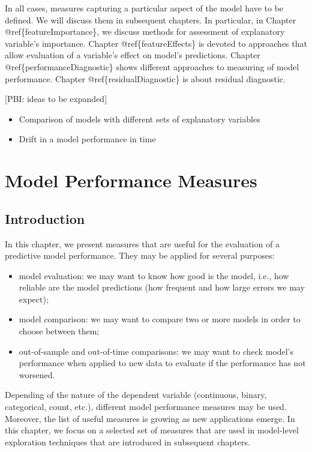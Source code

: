 \documentclass[12pt,]{krantz}
\providecommand{\tightlist}{%
  \setlength{\itemsep}{0pt}\setlength{\parskip}{0pt}}
\begin{document}
In all cases, measures capturing a particular aspect of the model have to be defined. We will discuss them in subsequent chapters. In particular, in Chapter @ref\{featureImportance\}, we discuss methods for assessment of explanatory variable's importance. Chapter @ref\{featureEffects\} is devoted to approaches that allow evaluation of a variable's effect on model's predictions.
Chapter @ref\{performanceDiagnostic\} shows different approaches to measuring of model performance. Chapter @ref\{residualDiagnostic\} is about residual diagnostic.

{[}PBI: ideas to be expanded{]}

\begin{itemize}
\tightlist
\item
  Comparison of models with different sets of explanatory variables
\item
  Drift in a model performance in time
\end{itemize}

\hypertarget{modelPerformance}{%
\section{Model Performance Measures}\label{modelPerformance}}

\hypertarget{modelPerformanceIntro}{%
\subsection{Introduction}\label{modelPerformanceIntro}}

In this chapter, we present measures that are useful for the evaluation of a predictive model performance. They may be applied for several purposes:

\begin{itemize}
\tightlist
\item
  model evaluation: we may want to know how good is the model, i.e., how reliable are the model predictions (how frequent and how large errors we may expect);
\item
  model comparison: we may want to compare two or more models in order to choose between them;
\item
  out-of-sample and out-of-time comparisons: we may want to check model's performance when applied to new data to evaluate if the performance has not worsened.
\end{itemize}

Depending of the nature of the dependent variable (continuous, binary, categorical, count, etc.), different model performance measures may be used. Moreover, the list of useful measures is growing as new applications emerge. In this chapter, we focus on a selected set of measures that are used in model-level exploration techniques that are introduced in subsequent chapters.
\end{document}
